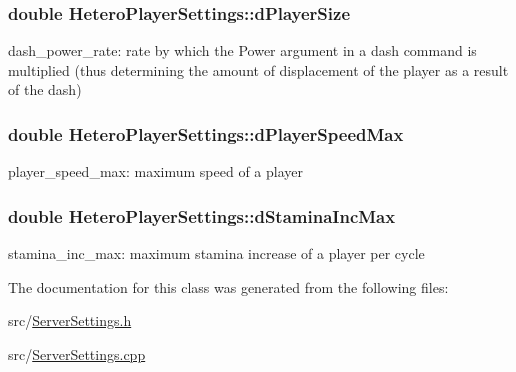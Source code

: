 \subsubsection[{\texorpdfstring{d\+Player\+Size}{dPlayerSize}}]{\setlength{\rightskip}{0pt plus 5cm}double Hetero\+Player\+Settings\+::d\+Player\+Size}\hypertarget{classHeteroPlayerSettings_ae9141d2aa716dabb576a382c8cbf9c2d}{}\label{classHeteroPlayerSettings_ae9141d2aa716dabb576a382c8cbf9c2d}
dash\+\_\+power\+\_\+rate\+: rate by which the \textquotesingle{}Power\textquotesingle{} argument in a \textquotesingle{}dash\textquotesingle{} command is multiplied (thus determining the amount of displacement of the player as a result of the \textquotesingle{}dash\textquotesingle{}) 
\subsubsection[{\texorpdfstring{d\+Player\+Speed\+Max}{dPlayerSpeedMax}}]{\setlength{\rightskip}{0pt plus 5cm}double Hetero\+Player\+Settings\+::d\+Player\+Speed\+Max}\hypertarget{classHeteroPlayerSettings_aa7aeceb8d73822e31567b0fc197c6107}{}\label{classHeteroPlayerSettings_aa7aeceb8d73822e31567b0fc197c6107}
player\+\_\+speed\+\_\+max\+: maximum speed of a player 
\subsubsection[{\texorpdfstring{d\+Stamina\+Inc\+Max}{dStaminaIncMax}}]{\setlength{\rightskip}{0pt plus 5cm}double Hetero\+Player\+Settings\+::d\+Stamina\+Inc\+Max}\hypertarget{classHeteroPlayerSettings_a2ee242dc6e818b579022c7d81c573d86}{}\label{classHeteroPlayerSettings_a2ee242dc6e818b579022c7d81c573d86}
stamina\+\_\+inc\+\_\+max\+: maximum stamina increase of a player per cycle 

The documentation for this class was generated from the following files\+:\begin{DoxyCompactItemize}
\item 
src/\hyperlink{ServerSettings_8h}{Server\+Settings.\+h}\item 
src/\hyperlink{ServerSettings_8cpp}{Server\+Settings.\+cpp}\end{DoxyCompactItemize}
